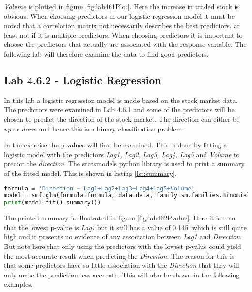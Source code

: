 \FloatBarrier

 
\emph{Volume} is plotted in figure \ref{fig:lab461Plot}. Here the increase in traded stock is obvious. When choosing predictors in our logistic regression model it must be noted that a correlation matrix not necessarily describes the best predictors, at least not if it is multiple predictors. When choosing predictors it is important to choose the predictors that actually are associated with the response variable. The following lab will therefore examine the data to find good predictors.

\subsection{Lab 4.6.2 - Logistic Regression}
\label{sec:lab462}
In this lab a logistic regression model is made based on the stock market data. The predictors were examined in Lab 4.6.1 and some of the predictors will be chosen to predict the direction of the stock market. The direction can either be \emph{up} or \emph{down} and hence this is a binary classification problem.

In the exercise the p-values will first be examined. This is done by fitting a logistic model with the predictors \emph{Lag1, Lag2, Lag3, Lag4, Lag5} and \emph{Volume} to predict the \emph{direction}. The statsmodels python library is used to print a summary of the fitted model. This is shown in listing \ref{lst:summary}.

\begin{lstlisting}[language=Python, label=lst:summary, caption=Printing summary]
formula = 'Direction ~ Lag1+Lag2+Lag3+Lag4+Lag5+Volume'
model = smf.glm(formula=formula, data=data, family=sm.families.Binomial())
print(model.fit().summary())
\end{lstlisting}

\FloatBarrier

The printed summary is illustrated in figure \ref{fig:lab462Pvalue}. Here it is  seen that the lowest p-value is \emph{Lag1} but it still has a value of 0.145, which is still quite high and it presents no evidence of any association between \emph{Lag1} and \emph{Direction}. But note here that only using the predictors with the lowest p-value could yield the most accurate result when predicting the \emph{Direction}. The reason for this is that some predictors have so little association with the \emph{Direction} that they will only make the prediction less accurate. This will also be shown in the following examples.


